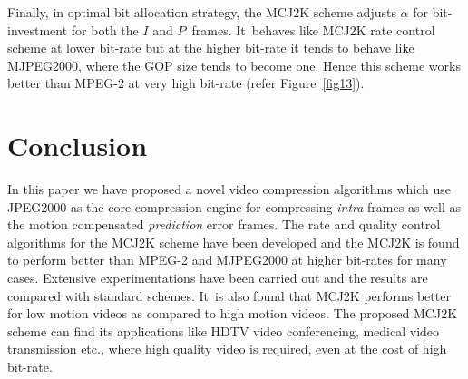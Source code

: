 \documentclass{doublecol-new}
\theoremstyle{TH}{
\newtheorem{lemma}{Lemma}[section]
\newtheorem{theorem}{Theorem}
\newtheorem{corrolary}{Corrolary}
\newtheorem{conjecture}[lemma]{Conjecture}
\newtheorem{proposition}[lemma]{Proposition}
\newtheorem{claim}[lemma]{Claim}
\newtheorem{stheorem}[lemma]{Wrong Theorem}
}
\theoremstyle{THrm}{
\newtheorem{definition}{Definition}[section]
\newtheorem{question}{Question}[section]
\newtheorem{remark}{Remark}[section]
\newtheorem{scheme}{Scheme}
}
\theoremstyle{THhit}{
\newtheorem{case}{Case}[section]
}
\begin{document}
Finally, in optimal bit allocation strategy, the MCJ2K scheme adjusts
$\alpha$ for bit-investment for both the $I$ and $P$~frames.
It~behaves like MCJ2K rate control scheme at lower bit-rate but at
the higher bit-rate it tends to behave like MJPEG2000, where the GOP
size tends to become one. Hence this scheme works better than MPEG-2
at very high bit-rate (refer Figure~\ref{fig13}).

\section{Conclusion}\label{conclusion}
\vspace*{6pt}

In this paper we have  proposed a novel video compression algorithms which
use JPEG2000 as the core compression engine for compressing {\it intra}
frames as well as the motion compensated {\it prediction} error frames.
The rate and quality control algorithms for the MCJ2K scheme have been
developed and the MCJ2K  is found to perform better than MPEG-2 and
MJPEG2000 at higher bit-rates for many  cases. Extensive experimentations
have been carried out and the results are compared with standard schemes.
It~is also found that MCJ2K performs better for low motion videos as
compared to high motion videos. The proposed MCJ2K scheme can find its
applications like HDTV video conferencing, medical video transmission
etc., where high quality video is required, even at the cost of high
bit-rate.
\end{document}
